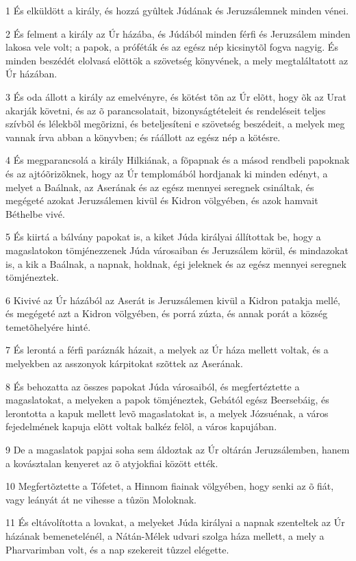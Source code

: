 \par 1 És elküldött a király, és hozzá gyûltek Júdának és Jeruzsálemnek minden vénei.
\par 2 És felment a király az Úr házába, és Júdából minden férfi és Jeruzsálem minden lakosa vele volt; a papok, a próféták és az egész nép kicsinytõl fogva nagyig. És minden beszédét elolvasá elõttök a szövetség könyvének, a mely megtaláltatott az Úr házában.
\par 3 És oda állott a király az emelvényre, és kötést tõn az Úr elõtt, hogy õk az Urat akarják követni, és az õ parancsolatait, bizonyságtételeit és rendeléseit teljes szívbõl és lélekbõl megõrizni, és beteljesíteni e szövetség beszédeit, a melyek meg vannak írva abban a könyvben; és ráállott az egész nép a kötésre.
\par 4 És megparancsolá a király Hilkiának, a fõpapnak és a másod rendbeli papoknak és az ajtóõrizõknek, hogy az Úr templomából hordjanak ki minden edényt, a melyet a Baálnak, az Aserának és az egész mennyei seregnek csináltak, és megégeté azokat Jeruzsálemen kivül és Kidron völgyében, és azok hamvait  Béthelbe vivé.
\par 5 És kiirtá a bálvány papokat is, a kiket Júda királyai állítottak be, hogy a magaslatokon tömjénezzenek Júda városaiban és Jeruzsálem körül, és mindazokat is, a kik a Baálnak, a napnak, holdnak, égi jeleknek és az egész mennyei  seregnek tömjéneztek.
\par 6 Kivivé az Úr házából az Aserát is Jeruzsálemen kivül a Kidron patakja mellé, és megégeté azt a Kidron völgyében, és porrá zúzta, és annak porát a község temetõhelyére hinté.
\par 7 És lerontá a férfi paráznák házait, a melyek az Úr háza mellett voltak, és a melyekben az asszonyok kárpitokat szõttek az Aserának.
\par 8 És behozatta az összes papokat Júda városaiból, és megfertéztette a magaslatokat, a melyeken a papok tömjéneztek, Gebától egész Beersebáig, és lerontotta a kapuk mellett levõ magaslatokat is, a melyek Józsuénak, a város fejedelmének kapuja elõtt voltak balkéz felõl, a város kapujában.
\par 9 De a magaslatok papjai soha sem áldoztak az Úr oltárán Jeruzsálemben, hanem a kovásztalan kenyeret az õ atyjokfiai között ették.
\par 10 Megfertõztette a Tófetet, a Hinnom fiainak völgyében, hogy senki az õ fiát, vagy leányát át ne vihesse a tûzön Moloknak.
\par 11 És eltávolította a lovakat, a melyeket Júda királyai a napnak szenteltek az Úr házának bemenetelénél, a Nátán-Mélek udvari szolga háza mellett, a mely a Pharvarimban volt, és a nap szekereit tûzzel elégette.
